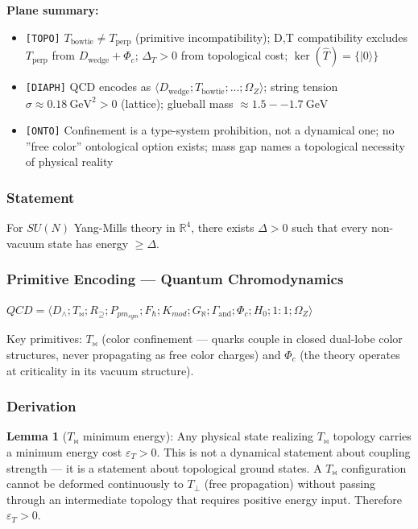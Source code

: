 \documentclass[12pt,a4paper]{article}
\begin{document}
\textbf{Plane summary:}

\begin{itemize}
    \item \texttt{{[}TOPO{]}} $T_{\text{bowtie}} \neq T_{\text{perp}}$ (primitive incompatibility); D,T compatibility excludes $T_{\text{perp}}$ from $D_{\text{wedge}} + \Phi_c$; $\Delta_T > 0$ from topological cost; $\ker(\hat{T}) = \{|0\rangle\}$
    \item \texttt{{[}DIAPH{]}} QCD encodes as $\langle D_{\text{wedge}}; T_{\text{bowtie}}; ...; \Omega_Z \rangle$; string tension $\sigma \approx 0.18\ \text{GeV}^2 > 0$ (lattice); glueball mass $\approx 1.5--1.7\ \text{GeV}$
    \item \texttt{{[}ONTO{]}} Confinement is a type-system prohibition, not a dynamical one; no ''free color'' ontological option exists; mass gap names a topological necessity of physical reality
\end{itemize}

\subsubsection{Statement}

For $SU(N)$ Yang-Mills theory in $\mathbb{R}^4$, there exists $\Delta > 0$ such that every non-vacuum state has energy $\ge \Delta$.

\subsubsection{Primitive Encoding --- Quantum Chromodynamics}

$QCD = \langle D_{\wedge}; T_{\bowtie}; R_{\supseteq}; P_{pm_{sym}}; F_{\hbar}; K_{mod}; G_{\aleph}; \Gamma_\text{and}; \Phi_c; {H_0}; {1:1}; \Omega_Z \rangle$

Key primitives: \textbf{$T_{\bowtie}$} (color confinement --- quarks couple in closed dual-lobe color structures, never propagating as free color charges) and \textbf{$\Phi_c$} (the theory operates at criticality in its vacuum structure).

\subsubsection{Derivation}

\textbf{Lemma 1} ($T_{\bowtie}$ minimum energy): Any physical state realizing $T_{\bowtie}$ topology carries a minimum energy cost $\varepsilon_T > 0$. This is not a dynamical statement about coupling strength --- it is a statement about topological ground states. A $T_{\bowtie}$ configuration cannot be deformed continuously to $T_{\perp}$ (free propagation) without passing through an intermediate topology that requires positive energy input. Therefore $\varepsilon_T > 0$.
\end{document}
